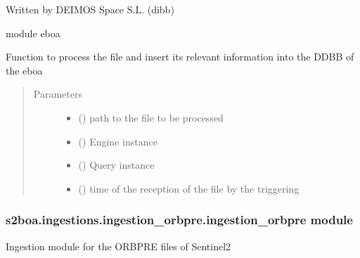 Written by DEIMOS Space S.L. (dibb)

module eboa

\begin{fulllineitems}
\label{\detokenize{s2boa.ingestions:s2boa.ingestions.ingestion_nppf.ingestion_nppf.process_file}}
Function to process the file and insert its relevant information
into the DDBB of the eboa
\begin{quote}\begin{description}
\item[{Parameters}] \leavevmode\begin{itemize}
\item {} 
 () \textendash{} path to the file to be processed

\item {} 
 () \textendash{} Engine instance

\item {} 
 () \textendash{} Query instance

\item {} 
 () \textendash{} time of the reception of the file by the triggering

\end{itemize}

\end{description}\end{quote}

\end{fulllineitems}



\subsubsection{s2boa.ingestions.ingestion\_orbpre.ingestion\_orbpre module}
\label{\detokenize{s2boa.ingestions:module-s2boa.ingestions.ingestion_orbpre.ingestion_orbpre}}\label{\detokenize{s2boa.ingestions:s2boa-ingestions-ingestion-orbpre-ingestion-orbpre-module}}
Ingestion module for the ORBPRE files of Sentinel\sphinxhyphen{}2

